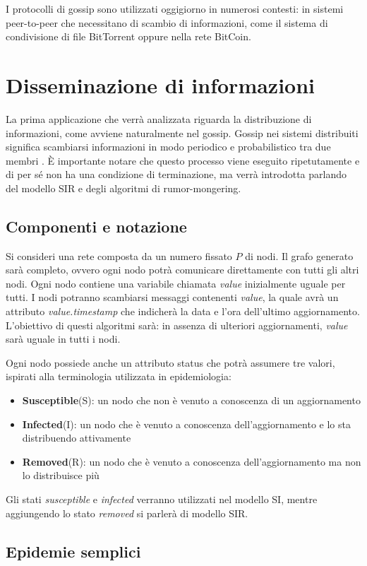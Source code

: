I protocolli di gossip sono utilizzati oggigiorno in numerosi contesti: in sistemi peer-to-peer che necessitano di scambio di informazioni, come il sistema di condivisione di file BitTorrent \cite{bittorrent} oppure nella rete BitCoin.

\section{Disseminazione di informazioni}
La prima applicazione che verrà analizzata riguarda la distribuzione di informazioni, come avviene naturalmente nel gossip. Gossip nei sistemi distribuiti significa scambiarsi informazioni in modo periodico e probabilistico tra due membri \cite{kermarrec}. È importante notare che questo processo viene eseguito ripetutamente e di per sé non ha una condizione di terminazione, ma verrà introdotta parlando del modello SIR e degli algoritmi di rumor-mongering.
\subsection{Componenti e notazione}
Si consideri una rete composta da un numero fissato $P$ di nodi. Il grafo generato sarà completo, ovvero ogni nodo potrà comunicare direttamente con tutti gli altri nodi. Ogni nodo contiene una variabile chiamata \textit{value} inizialmente uguale per tutti. I nodi potranno scambiarsi messaggi contenenti \textit{value}, la quale avrà un attributo \textit{value.timestamp} che indicherà la data e l'ora dell'ultimo aggiornamento. L'obiettivo di questi algoritmi sarà: in assenza di ulteriori aggiornamenti, \textit{value} sarà uguale in tutti i nodi.

Ogni nodo possiede anche un attributo status che potrà assumere tre valori, ispirati alla terminologia utilizzata in epidemiologia:
\begin{itemize}
    \item \textbf{Susceptible}(S): un nodo che non è venuto a conoscenza di un aggiornamento
    \item \textbf{Infected}(I): un nodo che è venuto a conoscenza dell'aggiornamento e lo sta distribuendo attivamente
    \item \textbf{Removed}(R): un nodo che è venuto a conoscenza dell'aggiornamento ma non lo distribuisce più
\end{itemize}
Gli stati \textit{susceptible} e \textit{infected} verranno utilizzati nel modello SI, mentre aggiungendo lo stato \textit{removed} si parlerà di modello SIR.
\subsection{Epidemie semplici}

